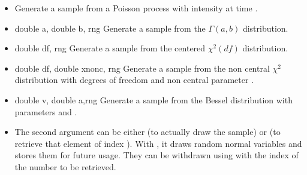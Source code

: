 \begin{itemize}
\item {}
  \sshortdescribe Generate a sample from a Poisson process with intensity
   at time .

\item {} {double a, double b, \PnlRng \ptr rng}
  \sshortdescribe Generate a sample from the $\Gamma(a, b)$ distribution.

\item {} {double df, \PnlRng \ptr rng}
  \sshortdescribe Generate a sample from the centered $\chi^2(df)$ distribution.
\item {} {double df, double xnonc, \PnlRng \ptr rng}
  \sshortdescribe Generate a sample from the non central $\chi^2$ distribution
  with  degrees of freedom and non central parameter .
\item {} {double v, double a,\PnlRng \ptr rng}
  \sshortdescribe Generate a sample from the Bessel distribution with parameters
   and .
\item {}
  \sshortdescribe The second argument can be either  (to actually
  draw the sample) or  (to retrieve that element of index
  ). With , it draws  random normal variables
  and stores them for future usage. They can be withdrawn using 
  with the index of the number to be retrieved.
\end{itemize}

